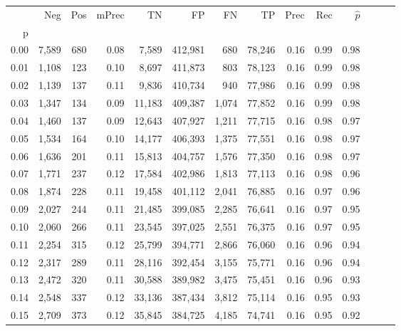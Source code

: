 \begin{tabular}{rrrrrrrrrrrrrr}
\toprule
{} &     Neg &    Pos & mPrec &       TN &       FP &      FN &      TP &  Prec &   Rec & $\hat{p}$ \\
p    &         &        &       &          &          &         &         &       &       &           \\
\midrule
0.00 &   7,589 &    680 &  0.08 &    7,589 &  412,981 &     680 &  78,246 &  0.16 &  0.99 &      0.98 \\
0.01 &   1,108 &    123 &  0.10 &    8,697 &  411,873 &     803 &  78,123 &  0.16 &  0.99 &      0.98 \\
0.02 &   1,139 &    137 &  0.11 &    9,836 &  410,734 &     940 &  77,986 &  0.16 &  0.99 &      0.98 \\
0.03 &   1,347 &    134 &  0.09 &   11,183 &  409,387 &   1,074 &  77,852 &  0.16 &  0.99 &      0.98 \\
0.04 &   1,460 &    137 &  0.09 &   12,643 &  407,927 &   1,211 &  77,715 &  0.16 &  0.98 &      0.97 \\
0.05 &   1,534 &    164 &  0.10 &   14,177 &  406,393 &   1,375 &  77,551 &  0.16 &  0.98 &      0.97 \\
0.06 &   1,636 &    201 &  0.11 &   15,813 &  404,757 &   1,576 &  77,350 &  0.16 &  0.98 &      0.97 \\
0.07 &   1,771 &    237 &  0.12 &   17,584 &  402,986 &   1,813 &  77,113 &  0.16 &  0.98 &      0.96 \\
0.08 &   1,874 &    228 &  0.11 &   19,458 &  401,112 &   2,041 &  76,885 &  0.16 &  0.97 &      0.96 \\
0.09 &   2,027 &    244 &  0.11 &   21,485 &  399,085 &   2,285 &  76,641 &  0.16 &  0.97 &      0.95 \\
0.10 &   2,060 &    266 &  0.11 &   23,545 &  397,025 &   2,551 &  76,375 &  0.16 &  0.97 &      0.95 \\
0.11 &   2,254 &    315 &  0.12 &   25,799 &  394,771 &   2,866 &  76,060 &  0.16 &  0.96 &      0.94 \\
0.12 &   2,317 &    289 &  0.11 &   28,116 &  392,454 &   3,155 &  75,771 &  0.16 &  0.96 &      0.94 \\
0.13 &   2,472 &    320 &  0.11 &   30,588 &  389,982 &   3,475 &  75,451 &  0.16 &  0.96 &      0.93 \\
0.14 &   2,548 &    337 &  0.12 &   33,136 &  387,434 &   3,812 &  75,114 &  0.16 &  0.95 &      0.93 \\
0.15 &   2,709 &    373 &  0.12 &   35,845 &  384,725 &   4,185 &  74,741 &  0.16 &  0.95 &      0.92 \\

\end{tabular}
